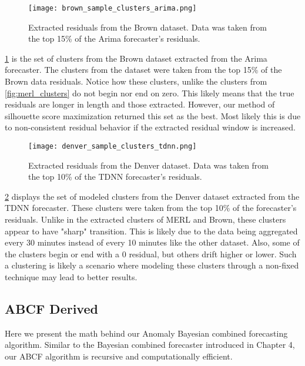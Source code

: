 \begin{figure}
	\begin{center}
		\texttt{[image: brown\_sample\_clusters\_arima.png]}
	\end{center}
	\caption{Extracted residuals from the Brown dataset.  Data was taken from the top 15\% of the Arima forecaster's residuals.}
	\label{fig:brown_clusters}
\end{figure}

\ref{fig:brown_clusters} is the set of clusters from the Brown dataset extracted from the Arima forecaster.  The clusters from the dataset were taken from the top 15\% of the Brown data residuals.  Notice how these clusters, unlike the clusters from \ref{fig:merl_clusters} do not begin nor end on zero.  This likely means that the true residuals are longer in length and those extracted.  However, our method of silhouette score maximization returned this set as the best.  Most likely this is due to non-consistent residual behavior if the extracted residual window is increased.
  
\begin{figure}
	\begin{center}
		\texttt{[image: denver\_sample\_clusters\_tdnn.png]}
	\end{center}
	\caption{Extracted residuals from the Denver dataset.  Data was taken from the top 10\% of the TDNN forecaster's residuals.}
	\label{fig:denver_clusters}
\end{figure}

\ref{fig:denver_clusters} displays the set of modeled clusters from the Denver dataset extracted from the TDNN forecaster.  These clusters were taken from the top 10\% of the forecaster's residuals.  Unlike in the extracted clusters of MERL and Brown, these clusters appear to have "sharp" transition.  This is likely due to the data being aggregated every 30 minutes instead of every 10 minutes like the other dataset.  Also, some of the clusters begin or end with a 0 residual, but others drift higher or lower.  Such a clustering is likely a scenario where modeling these clusters through a non-fixed technique may lead to better results.


\subsection{ABCF Derived}
\label{sec:abcf}
Here we present the math behind our Anomaly Bayesian combined forecasting algorithm.  Similar to the Bayesian combined forecaster introduced in Chapter 4, our ABCF algorithm is recursive and computationally efficient.  

